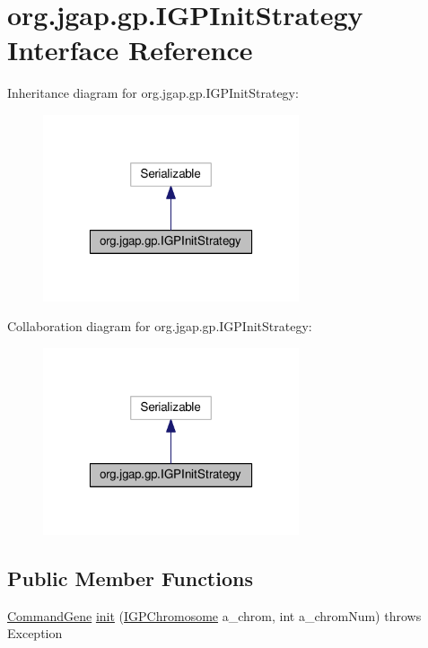 \hypertarget{interfaceorg_1_1jgap_1_1gp_1_1_i_g_p_init_strategy}{\section{org.\-jgap.\-gp.\-I\-G\-P\-Init\-Strategy Interface Reference}
\label{interfaceorg_1_1jgap_1_1gp_1_1_i_g_p_init_strategy}
}


Inheritance diagram for org.\-jgap.\-gp.\-I\-G\-P\-Init\-Strategy\-:
\nopagebreak
\begin{figure}[H]
\begin{center}
\leavevmode
\includegraphics[width=214pt]{interfaceorg_1_1jgap_1_1gp_1_1_i_g_p_init_strategy__inherit__graph}
\end{center}
\end{figure}


Collaboration diagram for org.\-jgap.\-gp.\-I\-G\-P\-Init\-Strategy\-:
\nopagebreak
\begin{figure}[H]
\begin{center}
\leavevmode
\includegraphics[width=214pt]{interfaceorg_1_1jgap_1_1gp_1_1_i_g_p_init_strategy__coll__graph}
\end{center}
\end{figure}
\subsection*{Public Member Functions}
\begin{DoxyCompactItemize}
\item 
\hyperlink{classorg_1_1jgap_1_1gp_1_1_command_gene}{Command\-Gene} \hyperlink{interfaceorg_1_1jgap_1_1gp_1_1_i_g_p_init_strategy_a64c9168fd47b19a0364127ed62b860bb}{init} (\hyperlink{interfaceorg_1_1jgap_1_1gp_1_1_i_g_p_chromosome}{I\-G\-P\-Chromosome} a\-\_\-chrom, int a\-\_\-chrom\-Num)  throws Exception
\end{DoxyCompactItemize}

